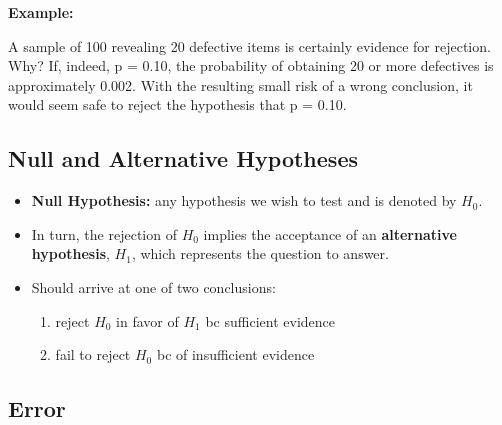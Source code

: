 \documentclass[10pt, letterpaper, twoside]{article}
\begin{document}
\begin{multicols}{2}
\textbf{Example:}

A sample of 100 revealing 20 defective items is certainly evidence for rejection. Why? If, indeed, p = 0.10, the probability of obtaining 20 or more defectives is approximately 0.002. With the resulting small risk of a wrong conclusion, it would seem safe to reject the hypothesis that p = 0.10.

\subsection{Null and Alternative Hypotheses}
\begin{itemize}
    \item \textbf{Null Hypothesis:} any hypothesis we wish to test and is denoted by $H_0$.
    \item In turn, the rejection of $H_0$ implies the acceptance of an \textbf{alternative hypothesis}, $H_1$, which represents the question to answer.
    \item Should arrive at one of two conclusions:
    \begin{enumerate}
        \item reject $H_0$ in favor of $H_1$ bc sufficient evidence
        \item fail to reject $H_0$ bc of insufficient evidence
    \end{enumerate}
\end{itemize}

\subsection{Error}


\end{multicols}
\end{document}
